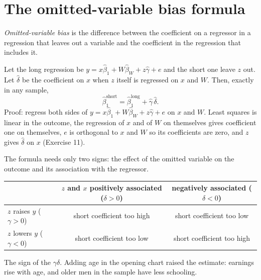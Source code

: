 \section{The omitted-variable bias formula}\label{sec:b2:multiple-regression:ovb}

\begin{definition}\label{def:b2:multiple-regression:ovb}
\emph{Omitted-variable bias} is the difference between the coefficient on a regressor in a
regression that leaves out a variable and the coefficient in the regression that includes it.
\end{definition}

Let the long regression be $y = x\hat\beta_1 + W\hat\beta_W + z\hat\gamma + e$ and the short one leave $z$ out. Let
$\hat\delta$ be the coefficient on $x$ when $z$ itself is regressed on $x$ and $W$. Then, exactly in any sample,
\begin{equation}\label{eq:b2:multiple-regression:ovb}
\hat\beta_1^{\text{short}} = \hat\beta_1^{\text{long}} + \hat\gamma\,\hat\delta.
\end{equation}
Proof: regress both sides of $y = x\hat\beta_1 + W\hat\beta_W + z\hat\gamma + e$ on $x$ and $W$. Least squares is linear
in the outcome, the regression of $x$ and of $W$ on themselves gives coefficient one on themselves, $e$ is orthogonal to
$x$ and $W$ so its coefficients are zero, and $z$ gives $\hat\delta$ on $x$ (Exercise 11).

The formula needs only two signs: the effect of the omitted variable on the outcome and its association with the
regressor.

\begin{omfigure}
\begin{tabular}{lcc}
\toprule
 & $z$ and $x$ positively associated ($\delta > 0$) & negatively associated ($\delta < 0$) \\
\midrule
$z$ raises $y$ ($\gamma > 0$) & short coefficient too high & short coefficient too low \\
$z$ lowers $y$ ($\gamma < 0$) & short coefficient too low & short coefficient too high \\
\bottomrule
\end{tabular}

\smallskip
{\small The sign of the  $\gamma\delta$. Adding age in the opening chart raised the estimate: earnings
rise with age, and older men in the sample have less schooling.}
\end{omfigure}

